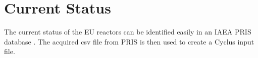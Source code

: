 \section{Current Status}
The current status of the EU reactors can be identified easily
in an \gls{IAEA} \gls{PRIS} database \cite{iaea_pris_nodate}.
The acquired csv file from \gls{PRIS} is then used to create a
Cyclus input file.